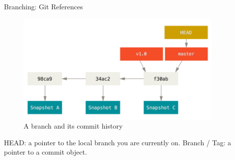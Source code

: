\begin{frame}[fragile]{Branching: Git References}
  \begin{figure}
    \includegraphics[width=0.9\textwidth]{branching/branch-and-history}
    \caption{A branch and its commit history}
  \end{figure}
  \begin{flushleft}
  \footnotesize
HEAD: a pointer to the local branch you are currently on. \break
Branch / Tag: a pointer to a commit object.
  \end{flushleft}
\end{frame}

